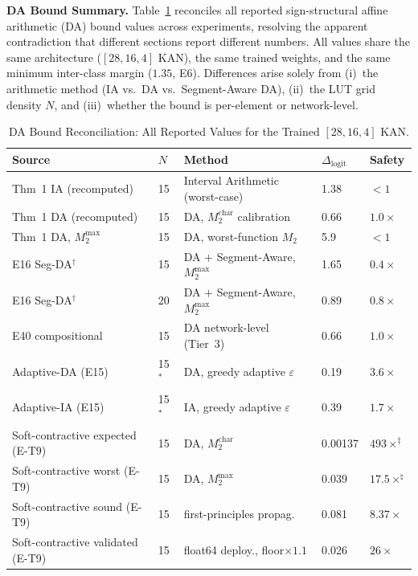 \documentclass[journal,onecolumn]{IEEEtran}
\begin{document}
\vspace{4pt}
\noindent\textbf{DA Bound Summary.}
Table~\ref{tab:da_bounds_summary} reconciles all reported sign-structural
affine arithmetic (DA) bound values across experiments, resolving the
apparent contradiction that different sections report different numbers.
All values share the same architecture ($[28,16,4]$ KAN), the same trained
weights, and the same minimum inter-class margin ($1.35$, E6). Differences
arise solely from (i)~the arithmetic method (IA vs.\ DA vs.\ Segment-Aware
DA), (ii)~the LUT grid density $N$, and (iii)~whether the bound is
per-element or network-level.

\begin{table}[t]
\centering
\caption{DA Bound Reconciliation: All Reported Values for the Trained $[28,16,4]$ KAN.}
\label{tab:da_bounds_summary}
\footnotesize
\begin{tabular}{@{}lllll@{}}
\toprule
\textbf{Source} & \textbf{$N$} & \textbf{Method} & \textbf{$\Delta_{\text{logit}}$} & \textbf{Safety} \\
\midrule
Thm~1 IA (recomputed)     & 15 & Interval Arithmetic (worst-case)   & 1.38  & $<1$ \\
Thm~1 DA (recomputed)     & 15 & DA, $M_2^{\text{char}}$ calibration & 0.66  & $1.0\times$ \\
Thm~1 DA, $M_2^{\max}$    & 15 & DA, worst-function $M_2$           & 5.9   & $<1$ \\
E16 Seg-DA$^{\dag}$       & 15 & DA $+$ Segment-Aware, $M_2^{\max}$ & 1.65  & $0.4\times$ \\
E16 Seg-DA$^{\dag}$       & 20 & DA $+$ Segment-Aware, $M_2^{\max}$ & 0.89  & $0.8\times$ \\
E40 compositional & 15 & DA network-level (Tier~3)                 & 0.66   & $1.0\times$ \\
Adaptive-DA (E15) & 15$^{*}$ & DA, greedy adaptive $\varepsilon$    & 0.19   & $3.6\times$ \\
Adaptive-IA (E15) & 15$^{*}$ & IA, greedy adaptive $\varepsilon$    & 0.39   & $1.7\times$ \\
Soft-contractive expected (E-T9) & 15 & DA, $M_2^{\text{char}}$ & 0.00137 & $493\times^{\ddag}$ \\
Soft-contractive worst (E-T9) & 15 & DA, $M_2^{\max}$ & 0.039 & $17.5\times^{\natural}$ \\
Soft-contractive sound (E-T9) & 15 & first-principles propag. & 0.081 & $8.37\times$ \\
Soft-contractive validated (E-T9) & 15 & float64 deploy., floor${\times}1.1$ & 0.026 & $26\times$ \\

\end{tabular}
\end{table}
\end{document}
